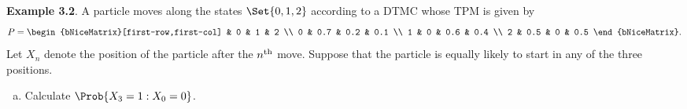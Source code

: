 \begin{Example}
    \textbf{Example 3.2}. A particle moves along the states $ \Set{0,1,2} $ according to a DTMC whose TPM
    is given by
    \[ P=\begin{bNiceMatrix}[first-row,first-col]
              & 0   & 1   & 2   \\
            0 & 0.7 & 0.2 & 0.1 \\
            1 & 0   & 0.6 & 0.4 \\
            2 & 0.5 & 0   & 0.5
        \end{bNiceMatrix}. \]
    Let $X_n$ denote the position of the particle after the $n\textsuperscript{th}$ move. Suppose that the particle is
    equally likely to start in any of the three positions.
    \begin{enumerate}[(a)]
        \item Calculate $ \Prob{X_3=1\given X_0=0} $.


\end{enumerate}
\end{Example}
